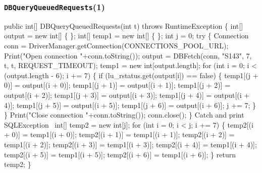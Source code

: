\documentclass{article}
\def\nwendcode{\endtrivlist \endgroup}      %
\let\nwdocspar=\par
\theoremstyle{definition}                   %
\begin{document}
\subsubsection{{\tt{}\protect{}DBQueryQueuedRequests}(1)}
\nwenddocs{}\endmoddef{}
public int[] DBQueryQueuedRequests(int t) throws RuntimeException \{
  int[] output = new int[] \{ \};
  int[] temp1 = new int[] \{ \};
  int j = 0;
  try \{
    Connection conn = DriverManager.getConnection(CONNECTIONS_POOL_URL);
    Print("Open connection "+conn.toString());
    output = DBFetch(conn, "S143", 7, t, t, REQUEST_TIMEOUT);
    temp1 = new int[output.length];
    for (int i = 0; i < (output.length - 6); i += 7) \{
      if (lu_rstatus.get(output[i]) == false) \{
        temp1[(j + 0)] = output[(i + 0)];
        temp1[(j + 1)] = output[(i + 1)];
        temp1[(j + 2)] = output[(i + 2)];
        temp1[(j + 3)] = output[(i + 3)];
        temp1[(j + 4)] = output[(i + 4)];
        temp1[(j + 5)] = output[(i + 5)];
        temp1[(j + 6)] = output[(i + 6)];
        j += 7;
      \}
    \}
    Print("Close connection "+conn.toString());
    conn.close();
  \}
  \LA{}Catch and print \code{}SQLException\edoc{}~{\nwtagstyle{}}\RA{}
  int[] temp2 = new int[j];
  for (int i = 0; i < j; i += 7) \{
    temp2[(i + 0)] = temp1[(i + 0)];
    temp2[(i + 1)] = temp1[(i + 1)];
    temp2[(i + 2)] = temp1[(i + 2)];
    temp2[(i + 3)] = temp1[(i + 3)];
    temp2[(i + 4)] = temp1[(i + 4)];
    temp2[(i + 5)] = temp1[(i + 5)];
    temp2[(i + 6)] = temp1[(i + 6)];
  \}
  return temp2;
\}
\eatline
{}\nwendcode{}\nwdocspar
\end{document}
